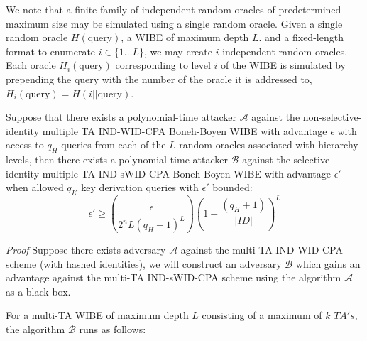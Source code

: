 \documentclass[10pt]{llncs}
\newcommand{\A}{\mathcal{A}}
\newcommand{\B}{\mathcal{B}}
\newcommand{\ID}{\mathit{ID}}
\newcommand{\TA}{\mathit{TA}}
\begin{document}
We note that a finite family of independent random oracles of predetermined maximum size may be simulated using a single random oracle. Given a single random oracle $H(\textrm{query})$, a WIBE of maximum depth $L$. and a fixed-length format to enumerate $i \in \{1 \ldots L\}$, we may create $i$ independent random oracles. Each oracle $H_i(\textrm{query})$ corresponding to level $i$ of the WIBE is simulated by prepending the query with the number of the oracle it is addressed to, $H_i(\textrm{query}) = H(i || \textrm{query})$.

\begin{theorem}
Suppose that there exists a polynomial-time attacker $\A$ against the non-selective-identity multiple TA IND-WID-CPA Boneh-Boyen WIBE with advantage $\epsilon$ with access to $q_H$ queries from each of the $L$ random oracles associated with hierarchy levels, then there exists a polynomial-time attacker $\B$ against the selective-identity multiple TA IND-sWID-CPA Boneh-Boyen WIBE with advantage $\epsilon'$ when allowed $q_K$ key derivation queries with $\epsilon'$ bounded:
$$\epsilon' \ge \left(\frac{\epsilon}{2^n L (q_H + 1)^L}\right)\left(1 - \frac{(q_H + 1)}{|\mathcal{\ID}|}\right)^L$$
\end{theorem}
\emph{Proof} Suppose there exists adversary $\A$ against the multi-TA IND-WID-CPA scheme (with hashed identities), we will construct an adversary $\B$ which gains an advantage against the multi-TA IND-sWID-CPA scheme using the algorithm $\A$ as a black box.

For a multi-TA WIBE of maximum depth $L$ consisting of a maximum of $k$ $\TA's$, the algorithm $\B$ runs as follows:
\end{document}
